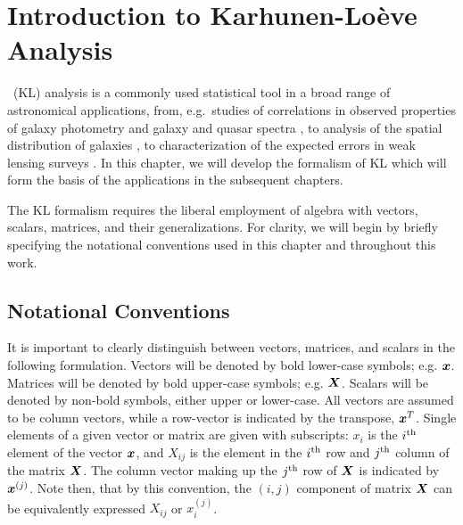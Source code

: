 \chapter{Introduction to Karhunen-Lo\`{e}ve Analysis}



\KL\ (KL) analysis is a commonly used statistical tool
in a broad range of astronomical applications, from, e.g.~studies of
correlations in observed properties of galaxy photometry \citep{Efstathiou84}
and galaxy and quasar spectra \citep{Connolly95,Connolly99,Yip04a,Yip04b},
to  analysis of the spatial distribution of galaxies 
\citep{Vogeley96, Matsubara00, Pope04}, to characterization of the 
expected errors in weak lensing surveys \citep{Kilbinger06, Munshi06}.
In this chapter, we will develop the formalism of KL which will form
the basis of the applications in the subsequent chapters.

The KL formalism requires the liberal
employment of algebra with vectors, scalars, matrices, and their
generalizations.
For clarity, we will begin by briefly specifying the notational
conventions used in this chapter and throughout this work.

\section{Notational Conventions}

It is important to clearly distinguish between vectors, matrices, and
scalars in the following formulation.  Vectors will be denoted by
bold lower-case symbols; e.g. $\boldsymbol{x}$.  Matrices will be denoted by
bold upper-case symbols; e.g. $\boldsymbol{X}$.  Scalars will be denoted by
non-bold symbols, either upper or lower-case.
All vectors are assumed to be column vectors, while a row-vector is
indicated by the transpose, $\boldsymbol{x}^T$.  
Single elements of a given
vector or matrix are given with subscripts: $x_i$ is the $i^{\rm th}$
element of the vector $\boldsymbol{x}$, and $X_{ij}$ is the element in the
$i^{\rm th}$ row and $j^{\rm th}$ column of the matrix $\boldsymbol{X}$.
The column vector making up the $j^{\rm th}$ row of $\boldsymbol{X}$ is
indicated by $\boldsymbol{x}^{(j)}$.  Note then, that by this convention,
the $(i, j)$ component of matrix $\boldsymbol{X}$ can be equivalently expressed
$X_{ij}$ or $x_i^{(j)}$.

